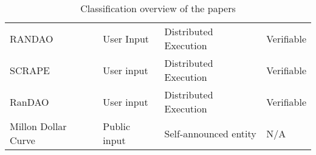 \begin{table}[htbp]
\begin{tabularx}{\textwidth}{Xlll}
RANDAO                         & User Input                             & Distributed Execution                  & Verifiable                  \\[1.5em]
SCRAPE                         & User input                             & Distributed Execution                  & Verifiable                  \\[1.5em]
RanDAO                         & User input                             & Distributed Execution                  & Verifiable                  \\[1.5em]
Millon Dollar Curve            & Public input                  & Self-announced entity                  & N/A                         \\\bottomrule
    \end{tabularx}
    \caption{Classification overview of the papers}\label{tab:paper_overview}
\end{table}

